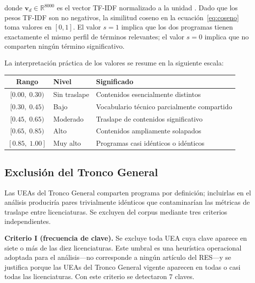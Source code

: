 \documentclass[11pt,a4paper]{article}
\begin{document}
donde $\mathbf{v}_d \in \mathbb{R}^{8000}$ es el vector TF-IDF normalizado a la unidad \citep[cap.~6]{Manning2008}.
Dado que los pesos TF-IDF son no negativos, la similitud coseno en la ecuación~\eqref{eq:coseno} toma valores en $[0,1]$.
El valor $s = 1$ implica que los dos programas tienen exactamente el mismo perfil de términos relevantes; el valor $s = 0$ implica que no comparten ningún término significativo.

La interpretación práctica de los valores se resume en la siguiente escala:

\begin{center}
\begin{tabular}{cll}
\toprule
\textbf{Rango} & \textbf{Nivel} & \textbf{Significado} \\
\midrule
$[0.00,\;0.30)$ & Sin traslape & Contenidos esencialmente distintos \\
$[0.30,\;0.45)$ & Bajo & Vocabulario técnico parcialmente compartido \\
$[0.45,\;0.65)$ & Moderado & Traslape de contenidos significativo \\
$[0.65,\;0.85)$ & Alto & Contenidos ampliamente solapados \\
$[0.85,\;1.00]$ & Muy alto & Programas casi idénticos o idénticos \\
\bottomrule
\end{tabular}
\end{center}

\subsection{Exclusión del Tronco General}

Las UEAs del Tronco General comparten programa por definición; incluirlas en el análisis produciría pares trivialmente idénticos que contaminarían las métricas de traslape entre licenciaturas.
Se excluyen del corpus mediante tres criterios independientes.

\textbf{Criterio I (frecuencia de clave).}
Se excluye toda UEA cuya clave aparece en siete o más de las diez licenciaturas.
Este umbral es una heurística operacional adoptada para el análisis---no corresponde a ningún artículo del RES---y se justifica porque las UEAs del Tronco General vigente aparecen en todas o casi todas las licenciaturas.
Con este criterio se detectaron 7 claves.
\end{document}
